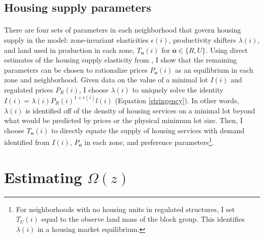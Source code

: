 \documentclass[12pt]{article}
\begin{document}
\subsection{Housing supply parameters}
\paragraph*{}
There are four sets of parameters in each neighborhood that govern housing supply in the model:  zone-invariant elasticities $\epsilon(i)$, productivity shifters $\lambda(i)$, and land used in production in each zone, $T_{\boldsymbol{o}}(i)$ for $\boldsymbol{o} \in \{R, U\}$. Using direct estimates of the housing supply elasticity from \cite{BSH}, I show that the remaining parameters can be chosen to rationalize prices $P_{\boldsymbol{o}}(i)$ as an equilibrium in each zone and neighborhood. Given data on the value of a minimal lot $I(i)$ and regulated prices $P_{R}(i)$, I choose $\lambda(i)$ to uniquely solve the identity $I(i) = \lambda(i)P_{R}(i)^{1 + \epsilon(i)}l(i)$ (Equation \ref{stringency}). In other words, $\lambda(i)$ is identified off of the density of housing services on a minimal lot beyond what would be predicted by prices or the physical minimum lot size. Then, I choose $T_{\boldsymbol{o}}(i)$ to directly equate the supply of housing services with demand identified from $I(i)$, $P_{\boldsymbol{o}}$ in each zone, and preference parameters\footnote{For neighborhoods with no housing units in regulated structures, I set $T_{U}(i)$ equal to the observe land mass of the block group. This identifies $\lambda(i)$ in a housing market equilibrium.}. 






\section{Estimating $\Omega(z)$}\label{Section:EstNeighborhoodChoice}
\end{document}
